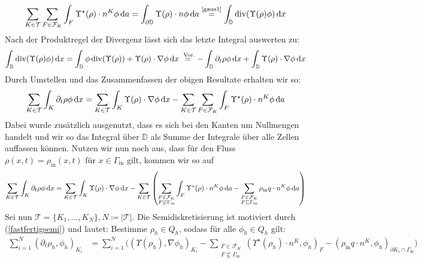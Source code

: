 \begin{align*}
	\sum_{K\in \mathcal{T}} \sum_{F \in \mathcal{F}_K} \int_F \Upsilon^{\star}(\rho) \cdot n^K \phi \, \mathrm{d} a = \int_{\partial \mathbb{D}} \Upsilon(\rho) \cdot n \phi \, \mathrm{d} a \stackrel{\text{\ref{gaus1}}}{=} \int_{\mathbb{D}} \operatorname{div} (\Upsilon(\rho)\phi) \, \mathrm{d} x
\end{align*}
Nach der Produktregel der Divergenz lässt sich das letzte Integral auswerten zu:
\begin{align*}
	 \int_{\mathbb{D}} \operatorname{div} (\Upsilon(\rho)\phi) \, \mathrm{d} x = \int_{\mathbb{D}} \phi \operatorname{div}(\Upsilon(\rho)) + \Upsilon(\rho) \cdot \nabla \phi \, \mathrm{d} x \stackrel{\text{ Vor.}}{=} - \int_{\mathbb{D}} \partial_t \rho \phi \, \mathrm{d} x + \int_{\mathbb{D}} \Upsilon(\rho) \cdot \nabla \phi \, \mathrm{d} x
\end{align*}
Durch Umstellen und das Zusammenfassen der obigen Resultate erhalten wir so: 
\begin{align*}
	\sum_{K \in \mathcal{T}} \int_K \partial_t \rho  \phi \, \mathrm{d} x = \sum_{K \in \mathcal{T}} \int_K \Upsilon(\rho ) \cdot \nabla \phi \, \mathrm{d} x - 	\sum_{K\in \mathcal{T}} \sum_{F \in \mathcal{F}_K} \int_F \Upsilon^{\star}(\rho) \cdot n^K \phi \, \mathrm{d} a
\end{align*}
Dabei wurde zusätzlich ausgenutzt, dass es sich bei den Kanten um Nullmengen handelt und wir so das Integral über $ \mathbb{D} $ als Summe der Integrale über alle Zellen auffassen können. Nutzen wir nun noch aus, dass für den Fluss  $\rho(x,t) = \rho_{\text{in}}(x,t)$ für $ x \in \Gamma_{\text{in}} $ gilt, kommen wir so auf 
\begin{align}
	\label{fastfertigsemi}
	\sum_{K \in \mathcal{T}} \int_K \partial_t \rho  \phi \, \mathrm{d} x = \sum_{K \in \mathcal{T}} \int_K \Upsilon(\rho ) \cdot \nabla \phi \, \mathrm{d} x - 	\sum_{K\in \mathcal{T}} \left( \sum_{\substack{F \in \mathcal{F}_K \\ F \not\subseteq \Gamma_{\text{in}}}} \int_F \Upsilon^{\star}(\rho) \cdot n^K \phi \, \mathrm{d} a - \sum_{\substack{F \in \mathcal{F}_K \\ F \subseteq \Gamma_{\text{in}}}} \rho_{\text{in}} q \cdot n^K \phi \, \mathrm{d} a \right)
\end{align}
Sei nun $ \mathcal{T} = \{ K_1,\dots , K_N\} , N \coloneqq |\mathcal{T}| $. Die Semidiskretisierung ist motiviert durch (\ref{fastfertigsemi}) und lautet: Bestimme  $\rho_h \in Q_h$, sodass für alle $ \phi_h \in Q_h $ gilt:
\begin{align}
	\label{Semidiskretisierung}
	\sum_{i=1}^N (\partial_t \rho_h, \phi_h)_{K_i} &= \sum_{i=1}^{N} \big( (\Upsilon(\rho_h), \nabla \phi_h)_{K_i} - \sum_{\substack{F \in \mathcal{F}_K \\ F \not \subseteq \Gamma_{\text{in}}}}(\Upsilon^{\star}(\rho_h)\cdot n^K,\phi_h)_{F} - (\rho_{\text{in}}q \cdot n^K,\phi_h)_{\partial K_i \cap \Gamma_{\text{in}}} \big)
\end{align}


